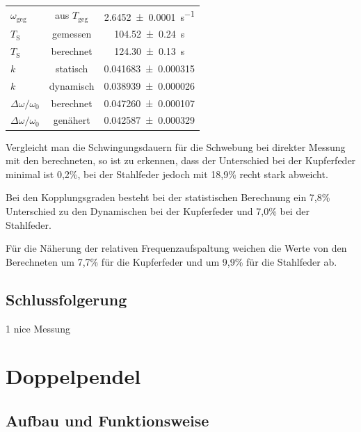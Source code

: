 \documentclass[11pt,a4paper,titlepage, ngerman]{article}
\begin{document}
\begin{table}[ht]
\begin{tabular}{l|S|S}
					{$\omega_\text{geg}$} & {aus $T_\text{geg}$} & \SI{2,6452 +- 0,0001}{\s^{-1}}\\
					{$T_\text{S}$} & {gemessen} & \SI{104,52 +- 0,24}{\second}\\
					{$T_\text{S}$} & {berechnet} & \SI{124,30 +- 0,13}{\second}\\
					{$k$} & {statisch} & \SI{0,041683 +- 0,000315}{}\\
					{$k$} & {dynamisch} & \SI{0,038939 +- 0,000026}{}\\
					{$\Delta\omega / \omega_0$} & {berechnet} & \SI{0,047260 +- 0,000107}{}\\
					{$\Delta\omega / \omega_0$} & {genähert} & \SI{0,042587 +- 0,000329}{}\\
				\end{tabular}
			\end{table}
			
			Vergleicht man die Schwingungsdauern für die Schwebung bei direkter Messung mit den berechneten, so ist zu erkennen, dass der Unterschied bei der Kupferfeder minimal ist 0,2\%, bei der Stahlfeder jedoch mit 18,9\% recht stark abweicht.
			
			Bei den Kopplungsgraden besteht bei der statistischen Berechnung ein 7,8\% Unterschied zu den Dynamischen bei der Kupferfeder und 7,0\% bei der Stahlfeder.
			
			Für die Näherung der relativen Frequenzaufspaltung weichen die Werte von den Berechneten um 7,7\% für die Kupferfeder und um 9,9\% für die Stahlfeder ab.
		\subsection{Schlussfolgerung}
			
			1 nice Messung				
			
	\section{Doppelpendel}
	
		\subsection{Aufbau und Funktionsweise}	
			
\end{document}
